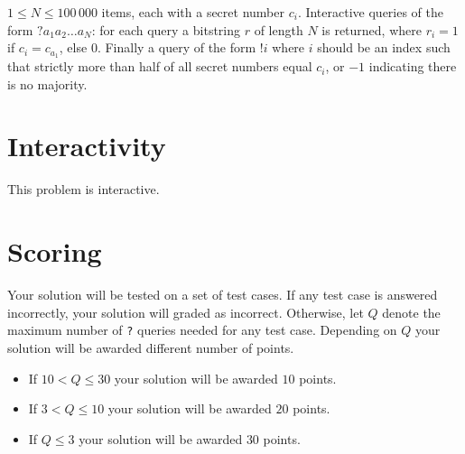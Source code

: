 $1 \le N \le 100\,000$ items, each with a secret number $c_i$.
Interactive queries of the form $? a_1 a_2 \dots a_N$: for each query a bitstring $r$ of length $N$ is returned, where $r_i = 1$ if $c_i = c_{a_1}$, else $0$.
Finally a query of the form $! i$ where $i$ should be an index such that strictly more than half of all secret numbers equal $c_i$, or $-1$ indicating there is no majority.

\section*{Interactivity}
This problem is interactive.

\section*{Scoring}
Your solution will be tested on a set of test cases.
If any test case is answered incorrectly, your solution will graded as incorrect.
Otherwise, let $Q$ denote the maximum number of \texttt{?} queries needed for any test case.
Depending on $Q$ your solution will be awarded different number of points.

\begin{itemize}
  \item If $10 < Q \le 30$ your solution will be awarded $10$ points.
  \item If $3 < Q \le 10$ your solution will be awarded $20$ points.
  \item If $Q \le 3$ your solution will be awarded $30$ points.
\end{itemize}
